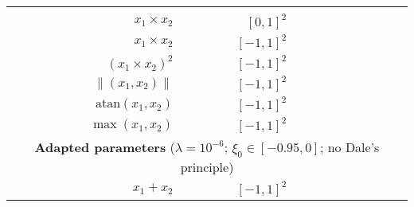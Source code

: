 \begin{table}
\begin{tabular}{r r r r r r r }
& \cellcolor{White!100!SteelBlue}{$\mathbf{5.2 \pm 0.6 \%}$}
& \cellcolor{White!80!SteelBlue}{$6.6 \pm 1.0 \%$}
& \cellcolor{White!60!SteelBlue}{$8.8 \pm 1.1 \%$}
\\
$x_1 \times x_2$
& $[0, 1]^2$
& \cellcolor{White!20!SteelBlue}{$17.4 \pm 1.2 \%$}
& \cellcolor{White!40!SteelBlue}{$8.5 \pm 0.7 \%$}
& \cellcolor{White!100!SteelBlue}{$\mathbf{4.3 \pm 0.5 \%}$}
& \cellcolor{White!80!SteelBlue}{$5.1 \pm 0.7 \%$}
& \cellcolor{White!60!SteelBlue}{$7.4 \pm 0.8 \%$}
\\
$x_1 \times x_2$
& $[-1, 1]^2$
& \cellcolor{White!20!SteelBlue}{$102.7 \pm 1.7 \%$}
& \cellcolor{White!100!SteelBlue}{$\mathbf{13.1 \pm 1.3 \%}$}
& \cellcolor{White!40!SteelBlue}{$79.6 \pm 2.9 \%$}
& \cellcolor{White!60!SteelBlue}{$38.1 \pm 4.4 \%$}
& \cellcolor{White!80!SteelBlue}{$36.3 \pm 4.3 \%$}
\\
$(x_1 \times x_2) ^ 2$
& $[-1, 1]^2$
& \cellcolor{White!60!SteelBlue}{$17.4 \pm 1.4 \%$}
& \cellcolor{White!20!SteelBlue}{$19.6 \pm 1.6 \%$}
& \cellcolor{White!40!SteelBlue}{$18.0 \pm 1.1 \%$}
& \cellcolor{White!100!SteelBlue}{$\mathbf{13.4 \pm 1.8 \%}$}
& \cellcolor{White!100!SteelBlue}{$\mathbf{13.4 \pm 1.7 \%}$}
\\
$\|(x_1, x_2)\|$
& $[-1, 1]^2$
& \cellcolor{White!60!SteelBlue}{$10.9 \pm 0.7 \%$}
& \cellcolor{White!20!SteelBlue}{$14.4 \pm 0.9 \%$}
& \cellcolor{White!100!SteelBlue}{$\mathbf{7.1 \pm 0.6 \%}$}
& \cellcolor{White!80!SteelBlue}{$7.3 \pm 0.7 \%$}
& \cellcolor{White!40!SteelBlue}{$11.4 \pm 1.5 \%$}
\\
$\mathrm{atan}(x_1, x_2)$
& $[-1, 1]^2$
& \cellcolor{White!20!SteelBlue}{$39.9 \pm 2.3 \%$}
& \cellcolor{White!40!SteelBlue}{$36.9 \pm 2.2 \%$}
& \cellcolor{White!100!SteelBlue}{$\mathbf{23.9 \pm 4.0 \%}$}
& \cellcolor{White!100!SteelBlue}{$\mathbf{23.9 \pm 3.3 \%}$}
& \cellcolor{White!60!SteelBlue}{$24.5 \pm 3.1 \%$}
\\
$\max(x_1, x_2)$
& $[-1, 1]^2$
& \cellcolor{White!20!SteelBlue}{$24.5 \pm 1.5 \%$}
& \cellcolor{White!40!SteelBlue}{$9.4 \pm 0.8 \%$}
& \cellcolor{White!80!SteelBlue}{$8.7 \pm 1.1 \%$}
& \cellcolor{White!100!SteelBlue}{$\mathbf{8.2 \pm 1.2 \%}$}
& \cellcolor{White!60!SteelBlue}{$8.9 \pm 1.3 \%$}
\\
\midrule
\multicolumn{7}{c}{\textbf{Adapted parameters} ($\lambda = 10^{-6}$; $\xi_0 \in [-0.95, 0]$; no Dale's principle)} \\
\midrule
$x_1 + x_2$
& $[-1, 1]^2$
& \cellcolor{White!100!SteelBlue}{$\mathbf{4.4 \pm 0.2 \%}$}
& \cellcolor{White!60!SteelBlue}{$7.7 \pm 0.4 \%$}

\end{tabular}
\end{table}
